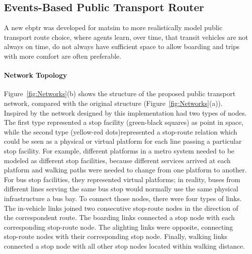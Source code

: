 \subsection{Events-Based Public Transport Router} 
\label{sec:RouterStructure}
A new \gls{ebptr} was developed for \gls{matsim} to more realistically model public transport route choice, where agents learn, over time, that transit vehicles are not always on time, do not always have sufficient space to allow boarding and trips with more comfort are often preferable.

\paragraph{Network Topology}

Figure~\ref{fig:Networks}(b) shows the structure of the proposed public transport network, compared with the original structure (Figure~\ref{fig:Networks}(a)). Inspired by the network designed by \citet{SpiessFlorian_TransResB_1989} this implementation had two types of nodes. The first type represented a stop facility (green-black squares) as point in space, while the second type (yellow-red dots)represented a stop-route relation which could be seen as a physical or virtual platform for each line  passing a particular stop facility. For example, different platforms in a metro system needed to be modeled as different stop facilities, because different services arrived at each platform and walking paths were needed to change from one platform to another. For bus stop facilities, they represented virtual platforms; in reality, buses from different lines serving the same bus stop would normally use the same physical infrastructure \eg a bus bay. To connect those nodes, there were four types of links. The in-vehicle links joined two consecutive stop-route nodes in the direction of the correspondent route. The boarding links connected a stop node with each corresponding stop-route node. The alighting links were opposite, connecting stop-route nodes with their corresponding stop node. Finally, walking links connected a stop node with all other stop nodes located within walking distance.

